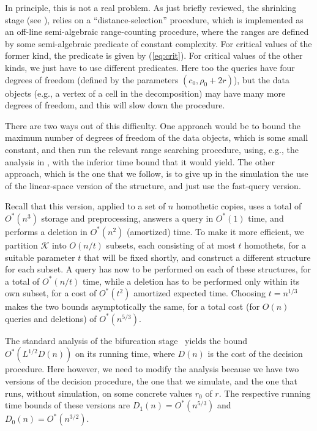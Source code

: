 \documentclass[11pt]{article}
\def\K{\mathcal{K}}
\theoremstyle{definition}
\begin{document}
In principle, this is not a real problem. As just briefly reviewed, the shrinking stage 
(see \cite{BFKKS,CH,KKSS}), relies on a ``distance-selection'' procedure, which is
implemented as an off-line semi-algebraic range-counting procedure, where the ranges
are defined by some semi-algebraic predicate of constant complexity. For critical
values of the former kind, the predicate is given by (\ref{eq:crit}). For critical
values of the other kinds, we just have to use different predicates. Here too the
queries have four degrees of freedom (defined by the parameters $(c_0,\rho_0+2r)$), 
but the data objects (e.g., a vertex of a cell in the decomposition) may have many more 
degrees of freedom, and this will slow down the procedure.

There are two ways out of this difficulty. One approach would be to bound the maximum 
number of degrees of freedom of the data objects, which is some small constant, and then run the relevant range 
searching procedure, using, e.g., the analysis in \cite[Appendix]{AAEKS}, with the
inferior time bound that it would yield. The other approach, which is the one that we follow,
is to give up in the simulation the use of the linear-space version of the structure,
and just use the fast-query version.

Recall that this version, applied to a set of $n$ homothetic copies, uses a total of $O^*(n^3)$
storage and preprocessing, answers a query in $O^*(1)$ time, and performs a deletion in
$O^*(n^2)$ (amortized) time. To make it more efficient, we partition $\K$ into $O(n/t)$ subsets, 
each consisting of at most $t$ homothets, for a suitable parameter $t$ that will be fixed shortly,
and construct a different structure for each subset. 
A query has now to be performed on each of these structures, for a total of $O^*(n/t)$ time,
while a deletion has to be performed only within its own subset, for a cost of $O^*(t^2)$
amortized expected time. Choosing $t=n^{1/3}$ makes the two bounds asymptotically the same, 
for a total cost (for $O(n)$ queries and deletions) of $O^*(n^{5/3})$.

The standard analysis of the bifurcation stage~\cite{BFKKS} yields the bound $O^*(L^{1/2}D(n))$ on its
running time, where $D(n)$ is the cost of the decision procedure. Here however, we need to
modify the analysis because we have two versions of the decision procedure, the one that we 
simulate, and the one that runs, without simulation, on some concrete values $r_0$ of $r$.
The respective running time bounds of these versions are $D_1(n) = O^*(n^{5/3})$ and
$D_0(n) = O^*(n^{3/2})$.
\end{document}
